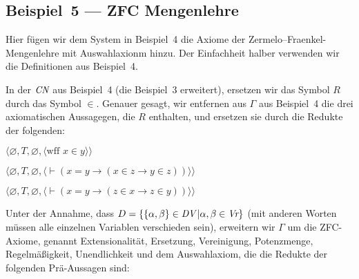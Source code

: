 \subsection{Beispiel~5 --- ZFC Mengenlehre}

Hier fügen wir dem System in Beispiel~4 die Axiome der Zermelo--Fraenkel-Mengenlehre mit Auswahlaxionm hinzu.  Der Einfachheit halber verwenden wir die Definitionen aus Beispiel~4.

In der $\mbox{\em CN}$ aus Beispiel~4 (die Beispiel~3 erweitert), ersetzen wir das Symbol $R$ durch das Symbol $\in$. Genauer gesagt, wir entfernen aus $\Gamma$ aus Beispiel~4 die drei axiomatischen Aussagegen, die $R$ enthalten, und ersetzen sie durch die Redukte der folgenden:
\begin{list}{}{\itemsep 0.0pt}
      \item[] $\langle\varnothing,T,\varnothing,
               \langle \mbox{wff\ }x\in y\rangle\rangle$
      \item[] $\langle\varnothing,T,
               \varnothing,
               \langle \vdash(x=y\to(x\in z\to y\in z))\rangle\rangle$
      \item[] $\langle\varnothing,T,
               \varnothing,
               \langle \vdash(x=y\to(z\in x\to z\in y))\rangle\rangle$
\end{list}
Unter der Annahme, dass $D=\{\{\alpha,\beta\}\in \mbox{\em DV}\,|\alpha,\beta\in \mbox{\em Vr}\}$ (mit anderen Worten müssen alle einzelnen Variablen verschieden sein), erweitern wir $\Gamma$ um die ZFC-Axiome, genannt
Extensionalität,
Ersetzung,
Vereinigung,
Potenzmenge,
Regelmäßigkeit,
Unendlichkeit und
dem Auswahlaxiom, die die Redukte der folgenden Prä-Aussagen sind:
